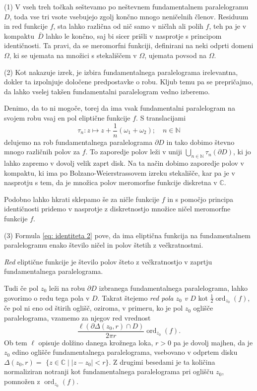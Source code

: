 \documentclass[mat1]{fmfdelo}
\numberwithin{equation}{section}
\newcommand{\N}{\mathbb N}
\newcommand{\C}{\mathbb C}
\newcommand{\om}{\omega}
\newcommand{\ord}[2]{\operatorname{ord}_{#1}(#2)}
\newcommand{\olsi}[1]{\,\overline{\!{#1}}} %
\theoremstyle{definition}
\begin{document}
\begin{opomba}
    \label{liouville opomba}

    (1) V vseh treh točkah seštevamo po neštevnem fundamentalnem paralelogramu $D$, toda vse tri vsote vsebujejo zgolj končno mnogo neničelnih členov. Residuum in red funkcije $f$, sta lahko različna od nič samo v ničlah ali polih $f$, teh pa je v kompaktu $\olsi{D}$ lahko le končno, saj bi sicer prišli v nasprotje s principom identičnosti. Ta pravi, da se meromorfni funkciji, definirani na neki odprti domeni $\Omega$, ki se ujemata na množici s stekališčem v $\Omega$, ujemata povsod na $\Omega$.
     
    (2) Kot nakazuje izrek, je izbira fundamentalnega paralelograma irelevantna, dokler ta izpolnjuje določene predpostavke o robu. Kljub temu pa se prepričajmo, da lahko vselej takšen fundamentalni paralelogram vedno izberemo. 

    Denimo, da to ni mogoče, torej da ima vsak fundamentalni paralelogram na svojem robu vsaj en pol eliptične funkcije $f$. S translacijami
    \[
        \tau_n : z \mapsto z + \frac{1}{n}(\om_1 + \om_2); \quad n\in \N
    \]
    delujemo na rob fundamentalnega paralelograma $\partial D$ in tako dobimo števno mnogo različnih polov za $f$. To zaporedje polov leži v uniji $\bigcup_{n \in \N} \tau_n(\partial D)$, ki jo lahko zapremo v dovolj velik zaprt disk. Na ta način dobimo zaporedje polov v kompaktu, ki ima po Bolzano-Weierstrassovem izreku stekališče, kar pa je v nasprotju s tem, da je množica polov meromorfne funkcije diskretna v $\C$. 
    
    Podobno lahko hkrati sklepamo še za ničle funkcije $f$ in s pomočjo principa identičnosti pridemo v nasprotje z diskretnostjo množice ničel meromorfne funkcije $f$.
    
    (3) Formula \eqref{eq: identiteta 2} pove, da ima eliptična funkcija na fundamentalnem paralelogramu enako število ničel in polov štetih z večkratnostmi. 

\end{opomba}

\begin{definicija}
    \emph{Red} eliptične funkcije je število polov šteto z večkratnostjo v zaprtju fundamentalnega paralelograma. 
\end{definicija}

Tudi če pol $z_0$ leži na robu $\partial D$ izbranega fundamentalnega paralelograma, lahko govorimo o redu tega pola v $D$. Takrat štejemo \emph{red pola $z_0$ v $D$} kot $\frac{1}{2}\ord{z_0}{f}$, če pol ni eno od štirih oglišč, oziroma, v primeru, ko je pol $z_0$ oglišče paralelograma, vzamemo za njegov red vrednost
\[
    \frac{\ell(\partial \Delta(z_0, r) \cap D)}{2 \pi r}\ord{z_0}{f}.
\]
Ob tem $\ell$ opisuje dolžino danega krožnega loka, $r > 0$ pa je dovolj majhen, da je $z_0$ edino oglišče fundamentalnega paralelograma, vsebovano v odprtem disku ${\Delta(z_0, r) =}$ ${\{z \in \C \mid \left\lvert z - z_0 \right\rvert < r\}}$. Z drugimi besedami je ta količina normaliziran notranji kot fundamentalnega paralelograma pri oglišču $z_0$, pomnožen z $\ord{z_0}{f}$.  
\end{document}
